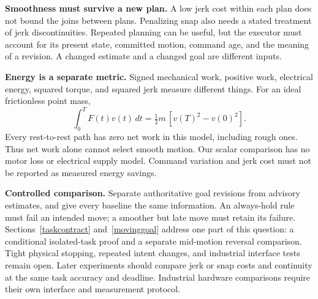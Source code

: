 \textbf{Smoothness must survive a new plan.} A low jerk cost within each plan does not bound the joins between plans. Penalizing snap also needs a stated treatment of jerk discontinuities. Repeated planning can be useful, but the executor must account for its present state, committed motion, command age, and the meaning of a revision. A changed estimate and a changed goal are different inputs.

\textbf{Energy is a separate metric.} Signed mechanical work, positive work, electrical energy, squared torque, and squared jerk measure different things. For an ideal frictionless point mass,
\[
\int_0^T F(t)v(t)\,dt=\tfrac12m\,[v(T)^2-v(0)^2].
\]
Every rest-to-rest path has zero net work in this model, including rough ones. Thus net work alone cannot select smooth motion. Our scalar comparison has no motor loss or electrical supply model. Command variation and jerk cost must not be reported as measured energy savings.

\textbf{Controlled comparison.} Separate authoritative goal revisions from advisory estimates, and give every baseline the same information. An always-hold rule must fail an intended move; a smoother but late move must retain its failure. Sections~\ref{taskcontract} and~\ref{movinggoal} address one part of this question: a conditional isolated-task proof and a separate mid-motion reversal comparison. Tight physical stopping, repeated intent changes, and industrial interface tests remain open. Later experiments should compare jerk or snap costs and continuity at the same task accuracy and deadline. Industrial hardware comparisons require their own interface and measurement protocol.
